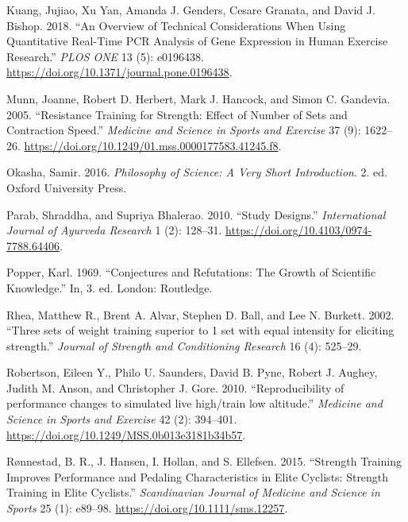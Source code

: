 \documentclass[
]{book}
\newlength{\cslhangindent}
\newlength{\cslentryspacingunit} %
\newenvironment{CSLReferences}[2] %
 {%
  \setlength{\parindent}{0pt}
  \ifodd #1
  \let\oldpar\par
  \def\par{\hangindent=\cslhangindent\oldpar}
  \fi
  \setlength{\parskip}{#2\cslentryspacingunit}
 }%
 {}
\begin{document}
\begin{CSLReferences}{1}{0}
\leavevmode{}%
Kuang, Jujiao, Xu Yan, Amanda J. Genders, Cesare Granata, and David J.
Bishop. 2018. {``An Overview of Technical Considerations When Using
Quantitative Real-Time PCR Analysis of Gene Expression in Human Exercise
Research.''} \emph{PLOS ONE} 13 (5): e0196438.
\url{https://doi.org/10.1371/journal.pone.0196438}.

\leavevmode{}%
Munn, Joanne, Robert D. Herbert, Mark J. Hancock, and Simon C. Gandevia.
2005. {``Resistance Training for Strength: Effect of Number of Sets and
Contraction Speed.''} \emph{Medicine and Science in Sports and Exercise}
37 (9): 1622--26.
\url{https://doi.org/10.1249/01.mss.0000177583.41245.f8}.

\leavevmode{}%
Okasha, Samir. 2016. \emph{Philosophy of Science: A Very Short
Introduction}. 2. ed. Oxford University Press.

\leavevmode{}%
Parab, Shraddha, and Supriya Bhalerao. 2010. {``Study Designs.''}
\emph{International Journal of Ayurveda Research} 1 (2): 128--31.
\url{https://doi.org/10.4103/0974-7788.64406}.

\leavevmode{}%
Popper, Karl. 1969. {``Conjectures and Refutations: The Growth of
Scientific Knowledge.''} In, 3. ed. London: Routledge.

\leavevmode{}%
Rhea, Matthew R., Brent A. Alvar, Stephen D. Ball, and Lee N. Burkett.
2002. {``Three sets of weight training superior to 1 set with equal
intensity for eliciting strength.''} \emph{Journal of Strength and
Conditioning Research} 16 (4): 525--29.

\leavevmode{}%
Robertson, Eileen Y., Philo U. Saunders, David B. Pyne, Robert J.
Aughey, Judith M. Anson, and Christopher J. Gore. 2010.
{``Reproducibility of performance changes to simulated live high/train
low altitude.''} \emph{Medicine and Science in Sports and Exercise} 42
(2): 394--401. \url{https://doi.org/10.1249/MSS.0b013e3181b34b57}.

\leavevmode{}%
Rønnestad, B. R., J. Hansen, I. Hollan, and S. Ellefsen. 2015.
{``Strength Training Improves Performance and Pedaling Characteristics
in Elite Cyclists: Strength Training in Elite Cyclists.''}
\emph{Scandinavian Journal of Medicine and Science in Sports} 25 (1):
e89--98. \url{https://doi.org/10.1111/sms.12257}.


\end{CSLReferences}
\end{document}
